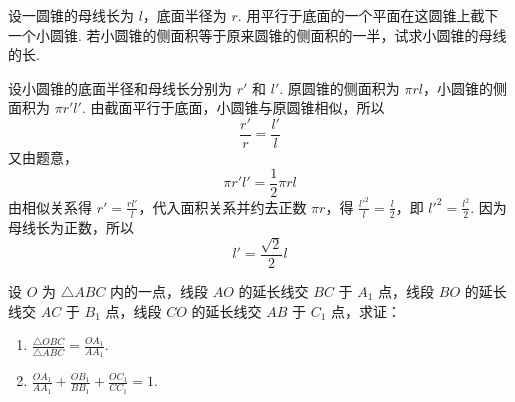\begin{problem}
设一圆锥的母线长为 \(l\)，底面半径为 \(r\). 用平行于底面的一个平面在这圆锥上截下一个小圆锥. 若小圆锥的侧面积等于原来圆锥的侧面积的一半，试求小圆锥的母线的长.

\end{problem}

\begin{solution}
设小圆锥的底面半径和母线长分别为 \(r'\) 和 \(l'\). 原圆锥的侧面积为 \(\pi rl\)，小圆锥的侧面积为 \(\pi r'l'\). 由截面平行于底面，小圆锥与原圆锥相似，所以
\[
\frac{r'}{r}=\frac{l'}{l}
\]
又由题意，
\[
\pi r'l'=\frac{1}{2}\pi rl
\]
由相似关系得 \(r'=\frac{rl'}{l}\)，代入面积关系并约去正数 \(\pi r\)，得 \(\frac{l'^2}{l}=\frac{l}{2}\)，即 \(l'^2=\frac{l^2}{2}\). 因为母线长为正数，所以
\[
l'=\frac{\sqrt{2}}{2}l
\]
\end{solution}

\begin{problem}
设 \(O\) 为 \(\triangle ABC\) 内的一点，线段 \(AO\) 的延长线交 \(BC\) 于 \(A_{1}\) 点，线段 \(BO\) 的延长线交 \(AC\) 于 \(B_{1}\) 点，线段 \(CO\) 的延长线交 \(AB\) 于 \(C_{1}\) 点，求证：

\begin{enumerate}
\item \(\frac{\triangle OBC}{\triangle ABC}=\frac{OA_{1}}{AA_{1}}\).
\item \(\frac{OA_{1}}{AA_{1}}+\frac{OB_{1}}{BB_{1}}+\frac{OC_{1}}{CC_{1}}=1\).
\end{enumerate}

\end{problem}

